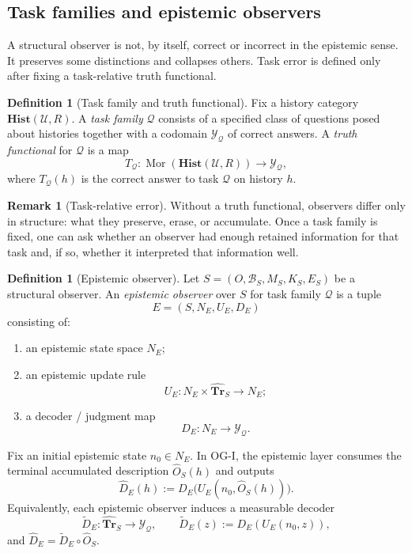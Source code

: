 \documentclass[11pt,twoside]{article}
\theoremstyle{definition}
\newtheorem{definition}[theorem]{Definition}
\newtheorem{remark}[theorem]{Remark}
\newcommand{\Hist}{\mathbf{Hist}}
\newcommand{\Tr}{\mathbf{Tr}}
\DeclareMathOperator{\Mor}{Mor}
\begin{document}
\subsection{Task families and epistemic observers}
\label{subsec:task-and-epistemic}

A structural observer is not, by itself, correct or incorrect in the epistemic sense. It preserves some distinctions and collapses others. Task error is defined only after fixing a task-relative truth functional.

\begin{definition}[Task family and truth functional]
\label{def:task-truth}
Fix a history category \(\Hist(\mathcal{U},R)\). A \emph{task family} \(\mathcal{Q}\) consists of a specified class of questions posed about histories together with a codomain \(\mathcal{Y}_{\mathcal{Q}}\) of correct answers. A \emph{truth functional} for \(\mathcal{Q}\) is a map
\[
  T_{\mathcal{Q}} : \Mor(\Hist(\mathcal{U},R)) \to \mathcal{Y}_{\mathcal{Q}},
\]
where \(T_{\mathcal{Q}}(h)\) is the correct answer to task \(\mathcal{Q}\) on history \(h\).
\end{definition}

\begin{remark}[Task-relative error]
\label{rem:task-relative-wrongness}
Without a truth functional, observers differ only in structure: what they preserve, erase, or accumulate. Once a task family is fixed, one can ask whether an observer had enough retained information for that task and, if so, whether it interpreted that information well.
\end{remark}

\begin{definition}[Epistemic observer]
\label{def:epistemic-observer}
Let \(S=(O,\mathcal{B}_S,M_S,K_S,E_S)\) be a structural observer. An \emph{epistemic observer} over \(S\) for task family \(\mathcal{Q}\) is a tuple
\[
  E = (S,N_E,U_E,D_E)
\]
consisting of:
\begin{enumerate}[leftmargin=*]
  \item an epistemic state space \(N_E\);
  \item an epistemic update rule
        \[
          U_E : N_E \times \widehat{\Tr}_S \to N_E;
        \]
  \item a decoder / judgment map
        \[
          D_E : N_E \to \mathcal{Y}_{\mathcal{Q}}.
        \]
\end{enumerate}
Fix an initial epistemic state \(n_0\in N_E\). In OG-I, the epistemic layer consumes the terminal accumulated description \(\widehat{O}_S(h)\) and outputs
\[
  \widehat{D}_E(h)
  :=
  D_E\!\bigl(U_E(n_0,\widehat{O}_S(h))\bigr).
\]
Equivalently, each epistemic observer induces a measurable decoder
\[
  \widetilde{D}_E : \widehat{\Tr}_S \to \mathcal{Y}_{\mathcal{Q}},
  \qquad
  \widetilde{D}_E(z):=D_E(U_E(n_0,z)),
\]
and \(\widehat{D}_E=\widetilde{D}_E\circ \widehat{O}_S\).
\end{definition}
\end{document}
